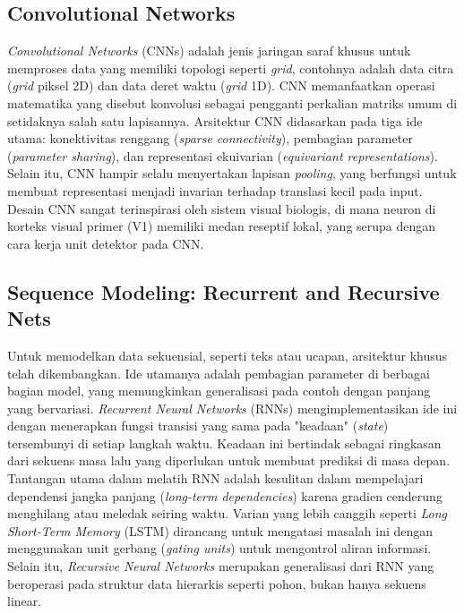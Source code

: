 \subsection{Convolutional Networks}
\textit{Convolutional Networks} (CNNs) adalah jenis jaringan saraf khusus untuk memproses data yang memiliki topologi seperti \textit{grid}, contohnya adalah data citra (\textit{grid} piksel 2D) dan data deret waktu (\textit{grid} 1D). CNN memanfaatkan operasi matematika yang disebut konvolusi sebagai pengganti perkalian matriks umum di setidaknya salah satu lapisannya. Arsitektur CNN didasarkan pada tiga ide utama: konektivitas renggang (\textit{sparse connectivity}), pembagian parameter (\textit{parameter sharing}), dan representasi ekuivarian (\textit{equivariant representations}). Selain itu, CNN hampir selalu menyertakan lapisan \textit{pooling}, yang berfungsi untuk membuat representasi menjadi invarian terhadap translasi kecil pada input. Desain CNN sangat terinspirasi oleh sistem visual biologis, di mana neuron di korteks visual primer (V1) memiliki medan reseptif lokal, yang serupa dengan cara kerja unit detektor pada CNN\parencite{Goodfellow2016}.

\subsection{Sequence Modeling: Recurrent and Recursive Nets}
Untuk memodelkan data sekuensial, seperti teks atau ucapan, arsitektur khusus telah dikembangkan. Ide utamanya adalah pembagian parameter di berbagai bagian model, yang memungkinkan generalisasi pada contoh dengan panjang yang bervariasi. \textit{Recurrent Neural Networks} (RNNs) mengimplementasikan ide ini dengan menerapkan fungsi transisi yang sama pada "keadaan" (\textit{state}) tersembunyi di setiap langkah waktu. Keadaan ini bertindak sebagai ringkasan dari sekuens masa lalu yang diperlukan untuk membuat prediksi di masa depan. Tantangan utama dalam melatih RNN adalah kesulitan dalam mempelajari dependensi jangka panjang (\textit{long-term dependencies}) karena gradien cenderung menghilang atau meledak seiring waktu. Varian yang lebih canggih seperti \textit{Long Short-Term Memory} (LSTM) dirancang untuk mengatasi masalah ini dengan menggunakan unit gerbang (\textit{gating units}) untuk mengontrol aliran informasi. Selain itu, \textit{Recursive Neural Networks} merupakan generalisasi dari RNN yang beroperasi pada struktur data hierarkis seperti pohon, bukan hanya sekuens linear\parencite{Goodfellow2016}.

